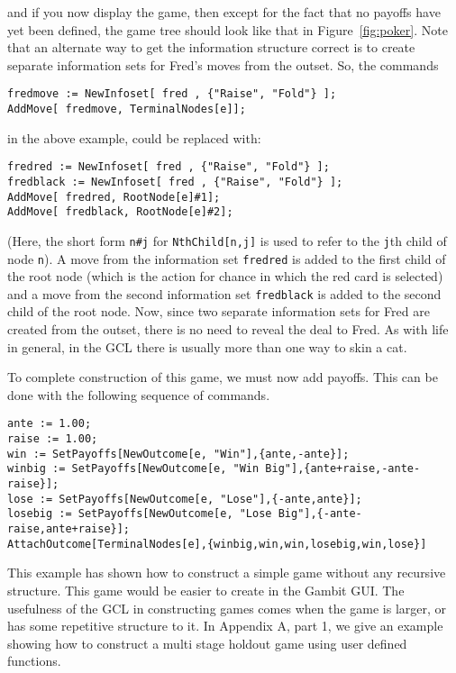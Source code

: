 \noindent
and if you now display the game, then except for the fact that no
payoffs have yet been defined, the game tree should look like that in
Figure~\ref{fig:poker}.  Note that an alternate way to get the
information structure correct is to create separate information sets
for Fred's moves from the outset.  So, the commands 

\begin{verbatim}
fredmove := NewInfoset[ fred , {"Raise", "Fold"} ];
AddMove[ fredmove, TerminalNodes[e]];
\end{verbatim}

\noindent
in the above example, could be replaced with:

\begin{verbatim}
fredred := NewInfoset[ fred , {"Raise", "Fold"} ];
fredblack := NewInfoset[ fred , {"Raise", "Fold"} ];
AddMove[ fredred, RootNode[e]#1];
AddMove[ fredblack, RootNode[e]#2];
\end{verbatim}

\noindent
(Here, the short form \verb+n#j+ for
\verb+NthChild[n,j]+ is used to refer to the
\verb+j+th child of node \verb+n+).  A move from the information set
\verb+fredred+ is added to the first child of the root node (which is
the action for chance in which the red card is selected) and a move
from the second information set \verb+fredblack+ is added to the
second child of the root node.  Now, since two separate information
sets for Fred are created from the outset, there is no need to reveal
the deal to Fred.  As with life in general, in the GCL there is
usually more than one way to skin a cat.

To complete construction of this game, we must now add payoffs. This
can be done with the following sequence of commands. 

\begin{verbatim}
ante := 1.00;
raise := 1.00;
win := SetPayoffs[NewOutcome[e, "Win"],{ante,-ante}];
winbig := SetPayoffs[NewOutcome[e, "Win Big"],{ante+raise,-ante-raise}];
lose := SetPayoffs[NewOutcome[e, "Lose"],{-ante,ante}];
losebig := SetPayoffs[NewOutcome[e, "Lose Big"],{-ante-raise,ante+raise}];
AttachOutcome[TerminalNodes[e],{winbig,win,win,losebig,win,lose}]
\end{verbatim}

This example has shown how to construct a simple game without any
recursive structure.  This game would be easier to create in the
Gambit GUI.  The usefulness of the GCL in constructing games comes
when the game is larger, or has some repetitive structure to it.  In
Appendix A, part 1, we give an example showing how to construct a multi stage
holdout game using user defined functions. 

